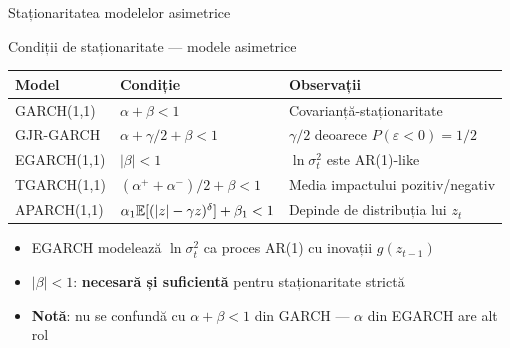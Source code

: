 \documentclass[9pt, aspectratio=169, t]{beamer}
\begin{document}
\begin{frame}{Staționaritatea modelelor asimetrice}
    \small
        \begin{block}{Condiții de staționaritate --- modele asimetrice}
            \begin{center}
            \begin{tabular}{lll}
                \toprule
                \textbf{Model} & \textbf{Condiție} & \textbf{Observații} \\
                \midrule
                GARCH(1,1) & $\alpha + \beta < 1$ & Covarianță-staționaritate \\
                GJR-GARCH & $\alpha + \gamma/2 + \beta < 1$ & $\gamma/2$ deoarece $P(\varepsilon<0) = 1/2$ \\
                EGARCH(1,1) & $|\beta| < 1$ & $\ln \sigma_t^2$ este AR(1)-like \\
                TGARCH(1,1) & $(\alpha^+ + \alpha^-)/2 + \beta < 1$ & Media impactului pozitiv/negativ \\
                APARCH(1,1) & $\alpha_1 \mathbb{E}[(|z|-\gamma z)^\delta] + \beta_1 < 1$ & Depinde de distribuția lui $z_t$ \\
                \bottomrule
            \end{tabular}
            \end{center}
        \end{block}
        \vspace{-1mm}
                \begin{prop}
            \begin{itemize}
                \item EGARCH modelează $\ln \sigma_t^2$ ca proces AR(1) cu inovații $g(z_{t-1})$
                \item $|\beta| < 1$: \textbf{necesară și suficientă} pentru staționaritate strictă
                \item \textbf{Notă}: nu se confundă cu $\alpha + \beta < 1$ din GARCH --- $\alpha$ din EGARCH are alt rol
            \end{itemize}
        \end{prop}        
\end{frame}
\end{document}
